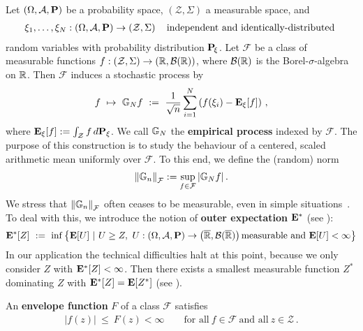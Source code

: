 Let 
$
  \left( 
    \Omega,
    \mathcal{A},
    \P
  \right)
$
be a probability space,
$
  \left( 
    \mathcal{Z},
    \Sigma
  \right)
$
a measurable space, and 
\begin{gather*}
  \xi_1,\ldots,\xi_N
  :
  \left( 
    \Omega,
    \mathcal{A},
    \P
  \right)
  \to
  \left( 
    \mathcal{Z},
    \Sigma
  \right)
  \quad
  \text{independent and identically-distributed
  }
\end{gather*}
random variables
with probability distribution $\P_{\!\xi}$.
Let $\mathcal{F}$ be a class of measurable functions 
$
  f:
  \left( 
    \mathcal{Z},
    \Sigma
  \right)
    \to
  \left( 
    \R,
    \mathcal{B}(\R)
  \right)
$, where
$
    \mathcal{B}(\R)
$
is the Borel-$\sigma$-algebra on $\R$.
Then $\mathcal{F}$
induces a stochastic process by
\begin{gather}
  f
  \ 
  \mapsto
  \ 
  \G_N f 
  \ 
  :=
  \ 
  \frac{1}{\sqrt{n}}
  \sum_{i=1}^{N} 
  \left(
    f(\xi_i)
    -
    \E_\xi[f]
  \right)
  \,,
\end{gather}
where
$
    \E_\xi[f]
    :=
    \int_\mathcal{Z}
    f
    \,
    d\P_\xi
$.
We call
$\G_N$ the  \textbf{empirical process} indexed by $\mathcal{F}$.
The purpose of this construction is to study the behaviour of a centered, scaled arithmetic mean uniformly over $\mathcal{F}$.
To this end, we define the (random) norm
\begin{gather}
  \norm{\G_n}_\mathcal{F}
  :=
  \sup_
        { f \in \mathcal{F}}
        \left|
          \G_N f
        \right|
        .
\end{gather}
We stress that 
$
  \norm{\G_n}_\mathcal{F}
$
often ceases to be measurable, even in simple situations~\cite[page 3]{vaart2013}.
To deal with this, we introduce the notion of \textbf{outer expectation} $\E^*$ (see \cite[page~6]{vaart2013}):
\index{$
  \E^*[Z]
$, outer expectation}
\begin{gather*}
  \E^*[Z]
  \ 
  :=
  \ 
    \inf
  \left\{ 
    \E[U]
  \ 
  \lvert
  \ 
    U\ge Z,
    \ 
    U:
  \left( 
    \Omega,
    \mathcal{A},
    \P
  \right)
  \to 
  \left( 
    \overline{\R},
    \mathcal{B}(\overline{\R})
  \right)
  \text{measurable and}
  \ 
  \E[U]<\infty
  \right\}
\end{gather*}
In our application the technical difficulties halt at this point, because we only consider $Z$ with $\E^*[Z]<\infty$. Then there exists a smallest measurable function $Z^*$ dominating $Z$ with
$\E^*[Z]=\E[Z^*]$ (see \cite[Lemma~1.2.1]{vaart2013}).

An \textbf{envelope function} $F$ of a class $\mathcal{F}$ satisfies 
\begin{align*}
|f(z)|
\ 
\le
\ 
F(z)< \infty 
\qquad
\text{for all}\ 
f\in\mathcal{F}
\ \text{and all}\ 
z\in\mathcal{Z}
\,.
\end{align*}

